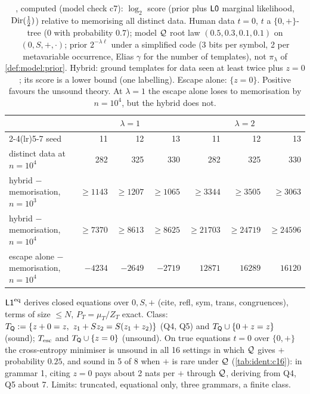 \begin{table}[ht]
\centering\small
\begin{tabular}{@{}lrrrrrr@{}}
\toprule
& \multicolumn{3}{c}{$\lambda=1$} & \multicolumn{3}{c}{$\lambda=2$}\\
\cmidrule(lr){2-4}\cmidrule(lr){5-7}
seed & 11 & 12 & 13 & 11 & 12 & 13\\
\midrule
distinct data at $n=10^4$ & 282 & 325 & 330 & 282 & 325 & 330\\
hybrid $-$ memorisation, $n=10^3$ & $\ge1143$ & $\ge1207$ & $\ge1065$ & $\ge3344$ & $\ge3505$ & $\ge3063$\\
hybrid $-$ memorisation, $n=10^4$ & $\ge7370$ & $\ge8613$ & $\ge8625$ & $\ge21703$ & $\ge24719$ & $\ge24596$\\
escape alone $-$ memorisation, $n=10^4$ & $-4234$ & $-2649$ & $-2719$ & $12871$ & $16289$ & $16120$\\
\bottomrule
\end{tabular}
\caption{, computed (model check c7): $\log_2$ score (prior plus $\mathord{\mathsf{L0}}$ marginal likelihood, $\mathrm{Dir}(\frac12)$) relative to memorising all distinct data. Human data $t=0$, $t$ a $\{0,+\}$-tree ($0$ with probability $0.7$); model $\mathcal{Q}$ root law $(0.5,0.3,0.1,0.1)$ on $(0,S,+,\cdot)$; prior $2^{-\lambda\ell}$ under a simplified code (3 bits per symbol, 2 per metavariable occurrence, Elias $\gamma$ for the number of templates), not $\pi_\lambda$ of \cref{def:model:prior}. Hybrid: ground templates for data seen at least twice plus $z=0$; its score is a lower bound (one labelling). Escape alone: $\{z=0\}$. Positive favours the unsound theory. At $\lambda=1$ the escape alone loses to memorisation by $n=10^4$, but the hybrid does not.}
\label{tab:ident:c7}
\end{table}

\begin{example}\label{ex:ident:lonedq}
$\mathord{\mathsf{L1}}^{\mathrm{eq}}$ derives closed equations over $0,S,+$ (cite, refl, sym, trans, congruences), terms of size $\le N$, $P_T=\mu_T/Z_T$ exact. Class: $T_\Q:=\{z+0=z,\ z_1+Sz_2=S(z_1+z_2)\}$ (Q4, Q5) and $T_{\mathsf{Q}}\cup\{0+z=z\}$ (sound); $T_{\mathrm{esc}}$ and $T_{\mathsf{Q}}\cup\{z=0\}$ (unsound). On true equations $t=0$ over $\{0,+\}$ the cross-entropy minimiser is unsound in all 16 settings in which $\mathcal{Q}$ gives $+$ probability $0.25$, and sound in 5 of 8 when $+$ is rare under $\mathcal{Q}$ (\cref{tab:ident:c16}): in grammar 1, citing $z=0$ pays about 2 nats per $+$ through $\mathcal{Q}$, deriving from Q4, Q5 about 7. Limits: truncated, equational only, three grammars, a finite class.
\end{example}

